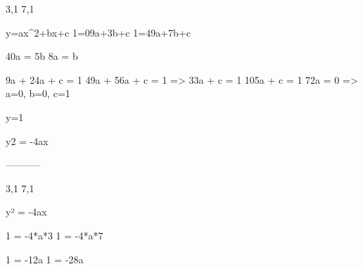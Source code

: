 
3,1
7,1

y=ax^2+bx+c
1=09a+3b+c
1=49a+7b+c

40a = 5b
 8a = b
 
 9a + 24a + c = 1
49a + 56a + c = 1
=>
 33a + c = 1
105a + c = 1
 72a = 0 => a=0, b=0, c=1
 
y=1

y2 = -4ax

-----------

3,1
7,1

y² = -4ax

1 = -4*a*3
1 = -4*a*7

1 = -12a
1 = -28a